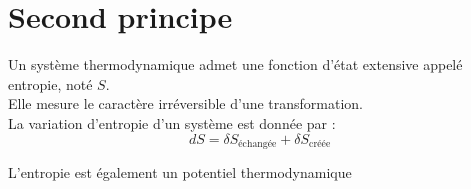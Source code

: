\chapter{Second principe}
\begin{thm}
Un système thermodynamique admet une fonction d'état extensive appelé entropie, noté $S$.\\
Elle mesure le caractère irréversible d'une transformation.\\
La variation d'entropie d'un système est donnée par :\\
$$dS=\delta S_{\text{échangée}}+\delta S_{\text{créée}}$$
\end{thm}
\begin{rmq}
L'entropie est également un potentiel thermodynamique
\end{rmq}